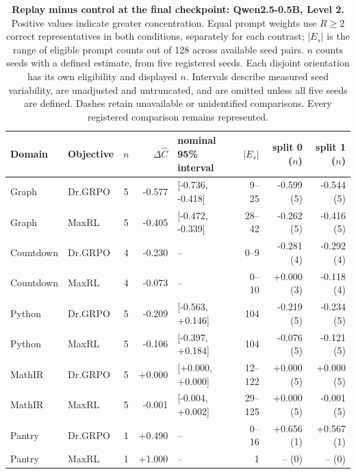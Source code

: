 \begin{table}[!htbp]
\centering
\scriptsize
\setlength{\tabcolsep}{3pt}
\begin{tabular}{@{}llcrlrrr@{}}
\toprule
Domain & Objective & $n$ & $\Delta\widehat C$ & nominal 95\% interval & $|E_s|$ & split 0 ($n$) & split 1 ($n$) \\
\midrule
Graph & Dr.GRPO & 5 & -0.577 & [-0.736, -0.418] & 9--25 & -0.599 (5) & -0.544 (5) \\
Graph & MaxRL & 5 & -0.405 & [-0.472, -0.339] & 28--42 & -0.262 (5) & -0.416 (5) \\
Countdown & Dr.GRPO & 4 & -0.230 & -- & 0--9 & -0.281 (4) & -0.292 (4) \\
Countdown & MaxRL & 4 & -0.073 & -- & 0--10 & +0.000 (3) & -0.118 (4) \\
Python & Dr.GRPO & 5 & -0.209 & [-0.563, +0.146] & 104 & -0.219 (5) & -0.234 (5) \\
Python & MaxRL & 5 & -0.106 & [-0.397, +0.184] & 104 & -0.076 (5) & -0.121 (5) \\
MathIR & Dr.GRPO & 5 & +0.000 & [+0.000, +0.000] & 12--122 & +0.000 (5) & +0.000 (5) \\
MathIR & MaxRL & 5 & -0.001 & [-0.004, +0.002] & 29--125 & +0.000 (5) & -0.001 (5) \\
Pantry & Dr.GRPO & 1 & +0.490 & -- & 0--16 & +0.656 (1) & +0.567 (1) \\
Pantry & MaxRL & 1 & +1.000 & -- & 1 & -- (0) & -- (0) \\
\bottomrule
\end{tabular}
\caption{\textbf{Replay minus control at the final checkpoint: Qwen2.5-0.5B, Level 2.} Positive values indicate greater concentration. Equal prompt weights use $R\ge2$ correct representatives in both conditions, separately for each contrast; $|E_s|$ is the range of eligible prompt counts out of 128 across available seed pairs. $n$ counts seeds with a defined estimate, from five registered seeds. Each disjoint orientation has its own eligibility and displayed $n$. Intervals describe measured seed variability, are unadjusted and untruncated, and are omitted unless all five seeds are defined. Dashes retain unavailable or unidentified comparisons. Every registered comparison remains represented.}
\end{table}

